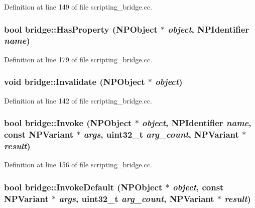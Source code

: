 Definition at line 149 of file scripting\_\-bridge.cc.

\hypertarget{namespacebridge_a1f13aed843891d4bb1f74a128c8a01a6}{
\subsubsection[{HasProperty}]{\setlength{\rightskip}{0pt plus 5cm}bool bridge::HasProperty (NPObject $\ast$ {\em object}, \/  NPIdentifier {\em name})}}
\label{namespacebridge_a1f13aed843891d4bb1f74a128c8a01a6}


Definition at line 179 of file scripting\_\-bridge.cc.

\hypertarget{namespacebridge_a5f416ee5de0e9e087f534db44feaae50}{
\subsubsection[{Invalidate}]{\setlength{\rightskip}{0pt plus 5cm}void bridge::Invalidate (NPObject $\ast$ {\em object})}}
\label{namespacebridge_a5f416ee5de0e9e087f534db44feaae50}


Definition at line 142 of file scripting\_\-bridge.cc.

\hypertarget{namespacebridge_a97317adbb62abc1208a12dc477848ae9}{
\subsubsection[{Invoke}]{\setlength{\rightskip}{0pt plus 5cm}bool bridge::Invoke (NPObject $\ast$ {\em object}, \/  NPIdentifier {\em name}, \/  const NPVariant $\ast$ {\em args}, \/  uint32\_\-t {\em arg\_\-count}, \/  NPVariant $\ast$ {\em result})}}
\label{namespacebridge_a97317adbb62abc1208a12dc477848ae9}


Definition at line 156 of file scripting\_\-bridge.cc.

\hypertarget{namespacebridge_abb680eea58acf1fbd1c8f90da763b6eb}{
\subsubsection[{InvokeDefault}]{\setlength{\rightskip}{0pt plus 5cm}bool bridge::InvokeDefault (NPObject $\ast$ {\em object}, \/  const NPVariant $\ast$ {\em args}, \/  uint32\_\-t {\em arg\_\-count}, \/  NPVariant $\ast$ {\em result})}}
\label{namespacebridge_abb680eea58acf1fbd1c8f90da763b6eb}


